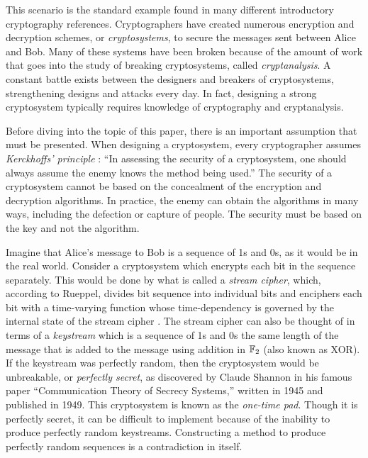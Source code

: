 \par This scenario is the standard example found in many different introductory
cryptography references. Cryptographers have created numerous encryption and decryption
schemes, or {\em cryptosystems}, to secure the messages sent between Alice and Bob.
Many of these systems have been broken because of the amount of work that goes into
the study of breaking cryptosystems, called {\em cryptanalysis}. A constant battle
exists between the designers and breakers of cryptosystems, strengthening designs and attacks every day.
In fact, designing a strong cryptosystem typically requires knowledge of cryptography and cryptanalysis.

\par Before diving into the topic of this paper, there is an important assumption that must
be presented. When designing a cryptosystem, every cryptographer assumes {\em Kerckhoffs' principle} \cite{bk:tw06}:
``In assessing the security of a cryptosystem, one should always assume the enemy knows the method
being used.'' The security of a cryptosystem
cannot be based on the concealment of the encryption and decryption algorithms. In practice,
the enemy can obtain the algorithms in many ways, including the defection or capture
of people. The security must be based on the key and not the algorithm. 

\par Imagine that Alice's message to Bob is a sequence of 1s and 0s, as it would be
in the real world. Consider a cryptosystem which encrypts each bit in the sequence
separately. This would be done by what is called a {\em stream cipher}, which, according to Rueppel,
divides bit sequence into individual bits and enciphers each bit with a time-varying
function whose time-dependency is governed by the internal state of the stream cipher \cite{rueppel_book}.
The stream cipher can also be thought of in terms of a {\em keystream} which is a
sequence of 1s and 0s the same length of the message that is added to the message
using addition in $\mathbb{F}_2$ (also known as XOR). If the keystream was perfectly random,
then the cryptosystem would be unbreakable, or {\em perfectly secret}, as
discovered by Claude Shannon in his famous paper ``Communication Theory of Secrecy Systems,''
written in 1945 and published in 1949. This cryptosystem is known as the {\em one-time pad}.
Though it is perfectly secret, it can be difficult to implement because of the inability
to produce perfectly random keystreams. Constructing a method to produce perfectly random
sequences is a contradiction in itself.%


